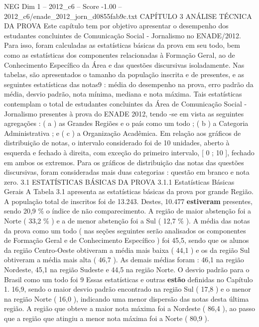 \begin{textsample}{NEG Dim 1 – 2012\_c6 – Score -1.00 – 2012\_c6/enade\_2012\_jorn\_d0855fab9c.txt}  \label{ex:f1_neg_259}
CAPÍTULO 3 ANÁLISE TÉCNICA DA PROVA Este capítulo tem por objetivo apresentar o desempenho dos estudantes concluintes de Comunicação Social - Jornalismo no ENADE/2012.
Para isso, foram calculadas as estatísticas básicas da prova em seu todo, bem como as estatísticas dos componentes relacionadas à Formação Geral, ao de Conhecimento Específico da Área e das questões discursivas isoladamente.
Nas tabelas, são apresentados o tamanho da população inscrita e de presentes, e as seguintes estatísticas das notas9 : média do desempenho na prova, erro padrão da média, desvio padrão, nota mínima, mediana e nota máxima.
Tais estatísticas contemplam o total de estudantes concluintes da Área de Comunicação Social - Jornalismo presentes à prova do ENADE 2012, tendo -se em vista as seguintes agregações : ( a ) as Grandes Regiões e o país como um todo ; ( b ) a Categoria Administrativa ; e ( c ) a Organização Acadêmica.
Em relação aos gráficos de distribuição de notas, o intervalo considerado foi de 10 unidades, aberto à esquerda e fechado à direita, com exceção do primeiro intervalo, [ 0 ; 10 ], fechado em ambos os extremos.
Para os gráficos de distribuição das notas das questões discursivas, foram consideradas mais duas categorias : questão em branco e nota zero. 3.1 ESTATÍSTICAS BÁSICAS DA PROVA 3.1.1 Estatísticas Básicas Gerais A Tabela 3.1 apresenta as estatísticas básicas da prova por grande Região.
A população total de inscritos foi de 13.243.
Destes, 10.477 \textbf{estiveram} presentes, sendo 20,9 \% o índice de não comparecimento.
A região de maior abstenção foi a Norte ( 33,2 \% ) e a de menor abstenção foi a Sul ( 12,7 \% ).
A média das notas da prova como um todo ( nas seções seguintes serão analisados os componentes de Formação Geral e de Conhecimento Específico ) foi 45,5, sendo que os alunos da região Centro-Oeste obtiveram a média mais baixa ( 44,1 ) e os da região Sul obtiveram a média mais alta ( 46,7 ).
As demais médias foram : 46,1 na região Nordeste, 45,1 na região Sudeste e 44,5 na região Norte.
O desvio padrão para o Brasil como um todo foi 9 Essas estatísticas e outras \textbf{estão} definidas no Capítulo 1. 16,9, sendo o maior desvio padrão encontrado na região Sul ( 17,8 ) e o menor na região Norte ( 16,0 ), indicando uma menor dispersão das notas desta última região.
A região que obteve a maior nota máxima foi a Nordeste ( 86,4 ), ao passo que a região que atingiu a menor nota máxima foi a Norte ( 80,9 ).

\end{textsample}
